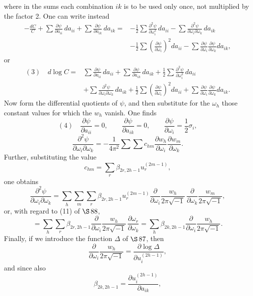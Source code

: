 \documentclass[10pt]{article}
\begin{document}
where in the sums each combination \(ik\) is to be used only once, not multiplied by the factor 2. One can write instead
\[
\begin{aligned}
-\frac{dC}{C}
+\sum\frac{\partial\psi}{\partial a_{ii}}\,da_{ii}
+\sum\frac{\partial\psi}{\partial a_{ik}}\,da_{ik}
={}&-\frac12\sum\frac{\partial^2\psi}{\partial\omega_i^2}\,da_{ii}
-\sum\frac{\partial^2\psi}{\partial\omega_i\partial\omega_k}\,da_{ik}\\
&-\frac12\sum\left(\frac{\partial\psi}{\partial\omega_i}\right)^2da_{ii}
-\sum\frac{\partial\psi}{\partial\omega_i}\frac{\partial\psi}{\partial\omega_k}da_{ik},
\end{aligned}
\]
or
\[
\begin{aligned}
(3)\quad d\log C={}&
\sum\frac{\partial\psi}{\partial a_{ii}}\,da_{ii}
+\sum\frac{\partial\psi}{\partial a_{ik}}\,da_{ik}
+\frac12\sum\frac{\partial^2\psi}{\partial\omega_i^2}\,da_{ii}\\
&+\sum\frac{\partial^2\psi}{\partial\omega_i\partial\omega_k}\,da_{ik}
+\frac12\sum\left(\frac{\partial\psi}{\partial\omega_i}\right)^2da_{ii}
+\sum\frac{\partial\psi}{\partial\omega_i}\frac{\partial\psi}{\partial\omega_k}da_{ik}.
\end{aligned}
\]
Now form the differential quotients of \(\psi\), and then substitute for the \(\omega_h\) those constant values for which the \(w_h\) vanish. One finds
\[
(4)\quad
\frac{\partial\psi}{\partial a_{ii}}=0,\qquad
\frac{\partial\psi}{\partial a_{ik}}=0,\qquad
\frac{\partial\psi}{\partial\omega_i}=\frac12\sigma_i,
\]
\[
\frac{\partial^2\psi}{\partial\omega_i\partial\omega_k}
=
-\frac{1}{4\pi^2}\sum\sum c_{hm}
\frac{\partial w_h}{\partial\omega_i}
\frac{\partial w_m}{\partial\omega_k}.
\]
Further, substituting the value
\[
c_{hm}=\sum_r\beta_{2r,2h-1}u_r^{(2m-1)},
\]
one obtains
\[
\frac{\partial^2\psi}{\partial\omega_i\partial\omega_k}
=
\sum_h\sum_m\sum_r
\beta_{2r,2h-1}u_r^{(2m-1)}
\frac{\partial}{\partial\omega_i}\frac{w_h}{2\pi\sqrt{-1}}\,
\frac{\partial}{\partial\omega_k}\frac{w_m}{2\pi\sqrt{-1}},
\]
or, with regard to (11) of \(\S\,88\),
\[
=
\sum_h\sum_r\beta_{2r,2h-1}
\frac{\partial}{\partial\omega_i}\frac{w_h}{2\pi\sqrt{-1}}\,
\frac{\partial\omega_r}{\partial\omega_k}
=
\sum_h\beta_{2k,2h-1}
\frac{\partial}{\partial\omega_i}\frac{w_h}{2\pi\sqrt{-1}}.
\]
Finally, if we introduce the function \(\Delta\) of \(\S\,87\), then
\[
\frac{\partial}{\partial\omega_i}\frac{w_h}{2\pi\sqrt{-1}}
=
\frac{\partial\log\Delta}{\partial u_i^{(2h-1)}},
\]
and since also
\[
\beta_{2k,2h-1}=\frac{\partial u_i^{(2h-1)}}{\partial a_{ik}},
\]
\end{document}
